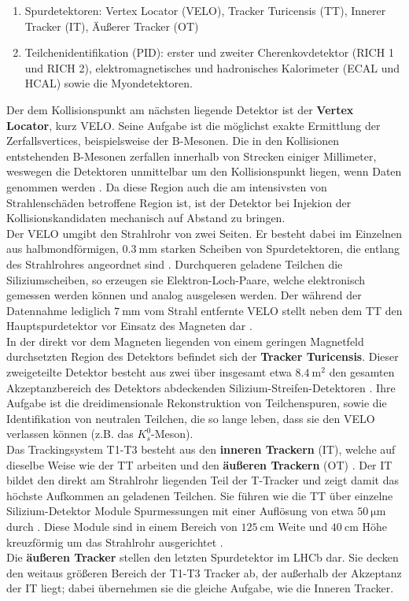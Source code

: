 %
\begin{enumerate}
  \item Spurdetektoren: Vertex Locator (VELO), Tracker Turicensis (TT), Innerer Tracker (IT), Äußerer Tracker (OT)
  \item Teilchenidentifikation (PID): erster und zweiter Cherenkovdetektor (RICH 1 und RICH 2), elektromagnetisches und hadronisches Kalorimeter (ECAL und HCAL) sowie die Myondetektoren.
\end{enumerate}
%
Der dem Kollisionspunkt am nächsten liegende Detektor ist der \textbf{Vertex Locator}, kurz VELO. Seine Aufgabe ist die möglichst exakte Ermittlung der Zerfallsvertices, beispielsweise der B-Mesonen. Die in den Kollisionen entstehenden B-Mesonen zerfallen innerhalb von Strecken einiger Millimeter, weswegen die Detektoren unmittelbar um den Kollisionspunkt liegen, wenn Daten genommen werden \cite{Tilburg}. Da diese Region auch die am intensivsten von Strahlenschäden betroffene Region ist, ist der Detektor bei Injekion der Kollisionskandidaten mechanisch auf Abstand zu bringen.\\
Der VELO umgibt den Strahlrohr von zwei Seiten. Er besteht dabei im Einzelnen aus halbmondförmigen, $\SI{0.3}{\milli\meter}$ starken Scheiben von Spurdetektoren, die entlang des Strahlrohres angeordnet sind \cite{Tilburg}. Durchqueren geladene Teilchen die Siliziumscheiben, so erzeugen sie Elektron-Loch-Paare, welche elektronisch gemessen werden können und analog ausgelesen werden. Der während der Datennahme lediglich $\SI{7}{\milli\meter}$ vom Strahl entfernte VELO stellt neben dem TT den Hauptspurdetektor vor Einsatz des Magneten dar \cite{Tilburg}. \\
%
In der direkt vor dem Magneten liegenden von einem geringen Magnetfeld durchsetzten Region des Detektors befindet sich der \textbf{Tracker Turicensis}. Dieser zweigeteilte Detektor besteht aus zwei über insgesamt etwa $\SI{8.4}{\meter\squared}$ den gesamten Akzeptanzbereich des Detektors abdeckenden Silizium-Streifen-Detektoren \cite{lhcb}. Ihre Aufgabe ist die dreidimensionale Rekonstruktion von Teilchenspuren, sowie die Identifikation von neutralen Teilchen, die so lange leben, dass sie den VELO verlassen können (z.B. das $K_s^0$-Meson).\\
%
Das Trackingsystem T1-T3 besteht aus den \textbf{inneren Trackern} (IT), welche auf dieselbe Weise wie der TT arbeiten und den \textbf{äußeren Trackern} (OT) \cite{tracker}. Der IT bildet den direkt am Strahlrohr liegenden Teil der T-Tracker und zeigt damit das höchste Aufkommen an geladenen Teilchen. Sie führen wie die TT über einzelne Silizium-Detektor Module Spurmessungen mit einer Auflösung von etwa $\SI{50}{\micro\meter}$ durch \cite{Tilburg}. Diese Module sind in einem Bereich von $\SI{125}{\centi\meter}$ Weite und $\SI{40}{\centi\meter}$ Höhe kreuzförmig um das Strahlrohr ausgerichtet \cite{tracker}.\\
Die \textbf{äußeren Tracker} stellen den letzten Spurdetektor im LHCb dar. Sie decken den weitaus größeren Bereich der T1-T3 Tracker ab, der außerhalb der Akzeptanz der IT liegt; dabei übernehmen sie die gleiche Aufgabe, wie die Inneren Tracker.\\

